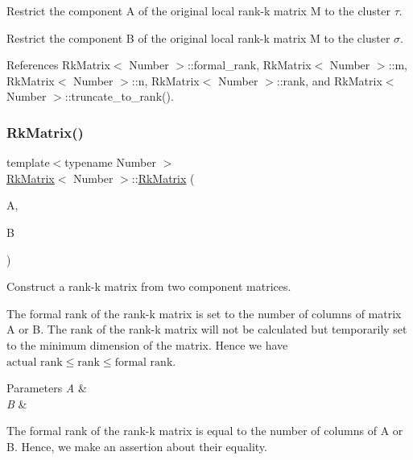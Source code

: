 Restrict the component {\ttfamily A} of the original local rank-\/k matrix {\ttfamily M} to the cluster $\tau$.

Restrict the component {\ttfamily B} of the original local rank-\/k matrix {\ttfamily M} to the cluster $\sigma$.

References Rk\+Matrix$<$ Number $>$\+::formal\+\_\+rank, Rk\+Matrix$<$ Number $>$\+::m, Rk\+Matrix$<$ Number $>$\+::n, Rk\+Matrix$<$ Number $>$\+::rank, and Rk\+Matrix$<$ Number $>$\+::truncate\+\_\+to\+\_\+rank().

\mbox{\label{classRkMatrix_a22cbf825bdbff58434ab3d4a6c478b96}} 
\subsubsection{\texorpdfstring{Rk\+Matrix()}{RkMatrix()}\hspace{0.1cm}{\footnotesize\ttfamily [14/19]}}
{\footnotesize\ttfamily template$<$typename Number $>$ \\
\hyperlink{classRkMatrix}{Rk\+Matrix}$<$ Number $>$\+::\hyperlink{classRkMatrix}{Rk\+Matrix} (\begin{DoxyParamCaption}\item[{const \hyperlink{classLAPACKFullMatrixExt}{L\+A\+P\+A\+C\+K\+Full\+Matrix\+Ext}$<$ Number $>$ \&}]{A,  }\item[{const \hyperlink{classLAPACKFullMatrixExt}{L\+A\+P\+A\+C\+K\+Full\+Matrix\+Ext}$<$ Number $>$ \&}]{B }\end{DoxyParamCaption})}

Construct a rank-\/k matrix from two component matrices.


\begin{DoxyDescription}
\item[Note ]The formal rank of the rank-\/k matrix is set to the number of columns of matrix {\ttfamily A} or {\ttfamily B}. The rank of the rank-\/k matrix will not be calculated but temporarily set to the minimum dimension of the matrix. Hence we have $\text{actual rank} \leq \text{rank} \leq \text{formal rank}$. 
\end{DoxyDescription}
\begin{DoxyParams}{Parameters}
{\em A} & \\
\hline
{\em B} & \\
\hline
\end{DoxyParams}
The formal rank of the rank-\/k matrix is equal to the number of columns of {\ttfamily A} or {\ttfamily B}. Hence, we make an assertion about their equality.\mbox{\label{classRkMatrix_ae15a15d55d04dd677a8dc90dbf789674}} 
